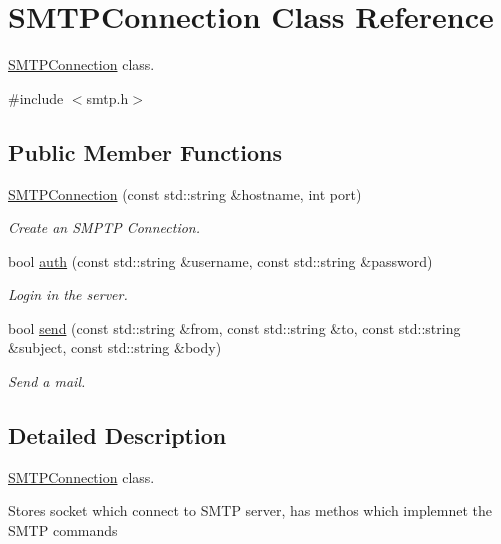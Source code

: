 \hypertarget{classSMTPConnection}{}\section{S\+M\+T\+P\+Connection Class Reference}
\label{classSMTPConnection}


\hyperlink{classSMTPConnection}{S\+M\+T\+P\+Connection} class.  




{\ttfamily \#include $<$smtp.\+h$>$}

\subsection*{Public Member Functions}
\begin{DoxyCompactItemize}
\item 
\hyperlink{classSMTPConnection_a3f3d0375660759191abae144bfeac15a}{S\+M\+T\+P\+Connection} (const std\+::string \&hostname, int port)
\begin{DoxyCompactList}\small\item\em Create an S\+M\+P\+TP Connection. \end{DoxyCompactList}\item 
bool \hyperlink{classSMTPConnection_a11fabb5c55b1a68df712bfa34f6524f5}{auth} (const std\+::string \&username, const std\+::string \&password)
\begin{DoxyCompactList}\small\item\em Login in the server. \end{DoxyCompactList}\item 
bool \hyperlink{classSMTPConnection_a3dd8487851420ebf087253ceaaa774eb}{send} (const std\+::string \&from, const std\+::string \&to, const std\+::string \&subject, const std\+::string \&body)
\begin{DoxyCompactList}\small\item\em Send a mail. \end{DoxyCompactList}\end{DoxyCompactItemize}


\subsection{Detailed Description}
\hyperlink{classSMTPConnection}{S\+M\+T\+P\+Connection} class. 

Stores socket which connect to S\+M\+TP server, has methos which implemnet the S\+M\+TP commands 


